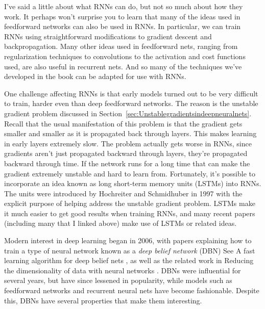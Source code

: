 I've said a little about what RNNs can do, but not so much about how they work. It perhaps won't surprise you to learn that many of the ideas used in feedforward networks can also be used in RNNs. In particular, we can train RNNs using straightforward modifications to gradient descent and backpropagation. Many other ideas used in feedforward nets, ranging from regularization techniques to convolutions to the activation and cost functions used, are also useful in recurrent nets. And so many of the techniques we've developed in the book can be adapted for use with RNNs. 

 One challenge affecting RNNs is that early models turned out to be very difficult to train, harder even than deep feedforward networks. The reason is the unstable gradient problem discussed in Section~\ref{sec:Unstablegradientsindeepneuralnets}. Recall that the usual manifestation of this problem is that the gradient gets smaller and smaller as it is propagated back through layers. This makes learning in early layers extremely slow. The problem actually gets worse in RNNs, since gradients aren't just propagated backward through layers, they're propagated backward through time. If the network runs for a long time that can make the gradient extremely unstable and hard to learn from. Fortunately, it's possible to incorporate an idea known as long short-term memory units (LSTMs) into RNNs. The units were introduced by Hochreiter and Schmidhuber in 1997\cite{Hochreiter1997} with the explicit purpose of helping address the unstable gradient problem. LSTMs make it much easier to get good results when training RNNs, and many recent papers (including many that I linked above) make use of LSTMs or related ideas.

 Modern interest in deep learning began in 2006, with papers explaining how to train a type of neural network known as a \textit{deep belief network} (DBN)
See A fast learning algorithm for deep belief nets \cite{HintonOsindero2006}, as well as the related work in Reducing the dimensionality of data with neural networks \cite{HintonSalakhutdinov2006b}. 
DBNs were influential for several years, but have since lessened in popularity, while models such as feedforward networks and recurrent neural nets have become fashionable. Despite this, DBNs have several properties that make them interesting.

